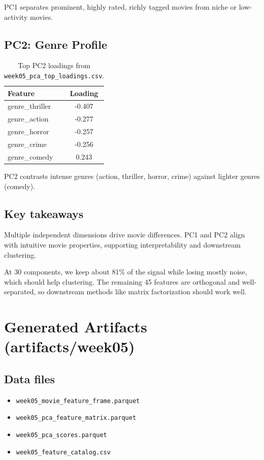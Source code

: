 \documentclass[11pt]{article}
\begin{document}
PC1 separates prominent, highly rated, richly tagged movies from niche or low-activity movies.

\subsection{PC2: Genre Profile}

\begin{table}[H]
\centering
\begin{tabular}{lc}
\toprule
Feature & Loading \\
\midrule
genre\_thriller & -0.407 \\
genre\_action & -0.277 \\
genre\_horror & -0.257 \\
genre\_crime & -0.256 \\
genre\_comedy & 0.243 \\
\bottomrule
\end{tabular}
\caption{Top PC2 loadings from \texttt{week05\_pca\_top\_loadings.csv}.}
\end{table}

PC2 contrasts intense genres (action, thriller, horror, crime) against lighter genres (comedy).

\subsection{Key takeaways}

Multiple independent dimensions drive movie differences. PC1 and PC2 align with intuitive movie properties, supporting interpretability and downstream clustering.

At 30 components, we keep about 81\% of the signal while losing mostly noise, which should help clustering. The remaining 45 features are orthogonal and well-separated, so downstream methods like matrix factorization should work well.

\section{Generated Artifacts (artifacts/week05)}

\subsection{Data files}

\begin{itemize}[leftmargin=1.5em]
    \item \texttt{week05\_movie\_feature\_frame.parquet}
    \item \texttt{week05\_pca\_feature\_matrix.parquet}
    \item \texttt{week05\_pca\_scores.parquet}
    \item \texttt{week05\_feature\_catalog.csv}
\end{itemize}
\end{document}
